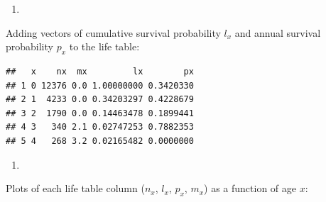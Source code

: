 \documentclass[
]{book}
\newenvironment{Shaded}{\begin{snugshade}}{\end{snugshade}}
\newcommand{\CommentTok}[1]{\textcolor[rgb]{0.56,0.35,0.01}{\textit{#1}}}
\newcommand{\DecValTok}[1]{\textcolor[rgb]{0.00,0.00,0.81}{#1}}
\newcommand{\FunctionTok}[1]{\textcolor[rgb]{0.00,0.00,0.00}{#1}}
\newcommand{\NormalTok}[1]{#1}
\newcommand{\OtherTok}[1]{\textcolor[rgb]{0.56,0.35,0.01}{#1}}
\newcommand{\SpecialCharTok}[1]{\textcolor[rgb]{0.00,0.00,0.00}{#1}}
\providecommand{\tightlist}{%
  \setlength{\itemsep}{0pt}\setlength{\parskip}{0pt}}
\begin{document}
\begin{enumerate}
\def\labelenumi{\arabic{enumi}.}
\setcounter{enumi}{2}
\tightlist
\item
\end{enumerate}

Adding vectors of cumulative survival probability \(l_x\) and annual survival probability \(p_x\) to the life table:

\begin{Shaded}
\end{Shaded}

\begin{verbatim}
##   x    nx  mx         lx        px
## 1 0 12376 0.0 1.00000000 0.3420330
## 2 1  4233 0.0 0.34203297 0.4228679
## 3 2  1790 0.0 0.14463478 0.1899441
## 4 3   340 2.1 0.02747253 0.7882353
## 5 4   268 3.2 0.02165482 0.0000000
\end{verbatim}

\begin{enumerate}
\def\labelenumi{\arabic{enumi}.}
\setcounter{enumi}{3}
\tightlist
\item
\end{enumerate}

Plots of each life table column (\(n_x\), \(l_x\), \(p_x\), \(m_x\)) as a function of age \(x\):
\end{document}
